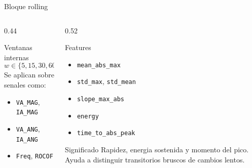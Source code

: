\documentclass[10pt,aspectratio=169]{beamer}
\newcommand{\code}[1]{\texttt{\footnotesize #1}}
\begin{document}
\begin{frame}{Bloque rolling}
\small
\begin{columns}[T,totalwidth=\textwidth]
\begin{column}{0.44\textwidth}
\begin{block}{Ventanas internas}
\[
w \in \{5,15,30,60,120\}
\]
Se aplican sobre senales como:
\begin{itemize}
  \item \code{VA\_MAG}, \code{IA\_MAG}
  \item \code{VA\_ANG}, \code{IA\_ANG}
  \item \code{Freq}, \code{ROCOF}
\end{itemize}
\end{block}
\end{column}
\begin{column}{0.52\textwidth}
\begin{block}{Features}
\begin{itemize}
  \item \code{mean\_abs\_max}
  \item \code{std\_max}, \code{std\_mean}
  \item \code{slope\_max\_abs}
  \item \code{energy}
  \item \code{time\_to\_abs\_peak}
\end{itemize}
\end{block}
\begin{exampleblock}{Significado}
Rapidez, energia sostenida y momento del pico. Ayuda a distinguir transitorios bruscos de cambios lentos.
\end{exampleblock}
\end{column}
\end{columns}
\end{frame}
\end{document}
